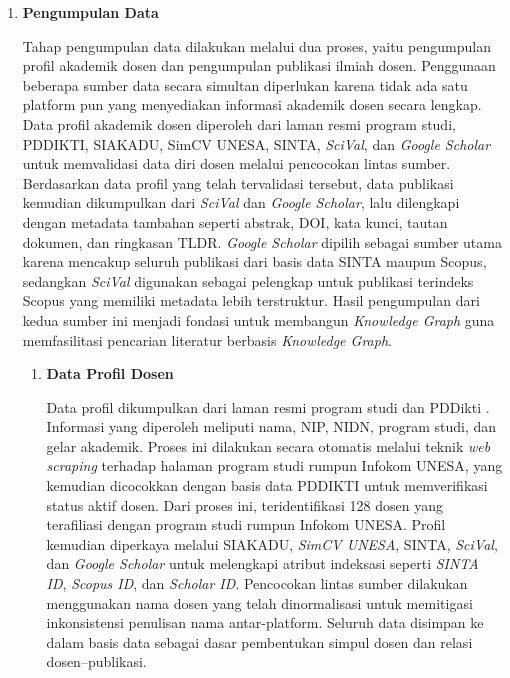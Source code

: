 \begin{enumerate}[label=\textbf{\arabic*.}, leftmargin=*, itemsep=10pt, listparindent=0.75cm]

    \item \textbf{Pengumpulan Data}

          Tahap pengumpulan data dilakukan melalui dua proses, yaitu pengumpulan profil akademik dosen dan pengumpulan publikasi ilmiah dosen. Penggunaan beberapa sumber data secara simultan diperlukan karena tidak ada satu platform pun yang menyediakan informasi akademik dosen secara lengkap. Data profil akademik dosen diperoleh dari laman resmi program studi, PDDIKTI, SIAKADU, SimCV UNESA, SINTA, \textit{SciVal}, dan \textit{Google Scholar} untuk memvalidasi data diri dosen melalui pencocokan lintas sumber. Berdasarkan data profil yang telah tervalidasi tersebut, data publikasi kemudian dikumpulkan dari \textit{SciVal} dan \textit{Google Scholar}, lalu dilengkapi dengan metadata tambahan seperti abstrak, DOI, kata kunci, tautan dokumen, dan ringkasan TLDR. \textit{Google Scholar} dipilih sebagai sumber utama karena mencakup seluruh publikasi dari basis data SINTA maupun Scopus, sedangkan \textit{SciVal} digunakan sebagai pelengkap untuk publikasi terindeks Scopus yang memiliki metadata lebih terstruktur. Hasil pengumpulan dari kedua sumber ini menjadi fondasi untuk membangun \textit{Knowledge Graph} guna memfasilitasi pencarian literatur berbasis \textit{Knowledge Graph}.



          \begin{enumerate}[label=\textbf{\alph*.}, leftmargin=0.75cm, itemsep=5pt, listparindent=0.75cm]
              \item \textbf{Data Profil Dosen}

                    Data profil dikumpulkan dari laman resmi program studi dan PDDikti \citep{pddikti_db}. Informasi yang diperoleh meliputi nama, NIP, NIDN, program studi, dan gelar akademik. Proses ini dilakukan secara otomatis melalui teknik \textit{web scraping} terhadap halaman program studi rumpun Infokom UNESA, yang kemudian dicocokkan dengan basis data PDDIKTI untuk memverifikasi status aktif dosen. Dari proses ini, teridentifikasi 128 dosen yang terafiliasi dengan program studi rumpun Infokom UNESA. Profil kemudian diperkaya melalui SIAKADU, \textit{SimCV UNESA}, SINTA, \textit{SciVal}, dan \textit{Google Scholar} untuk melengkapi atribut indeksasi seperti \textit{SINTA ID}, \textit{Scopus ID}, dan \textit{Scholar ID}. Pencocokan lintas sumber dilakukan menggunakan nama dosen yang telah dinormalisasi untuk memitigasi inkonsistensi penulisan nama antar-platform. Seluruh data disimpan ke dalam basis data sebagai dasar pembentukan simpul dosen dan relasi dosen--publikasi.


\end{enumerate}
\end{enumerate}
